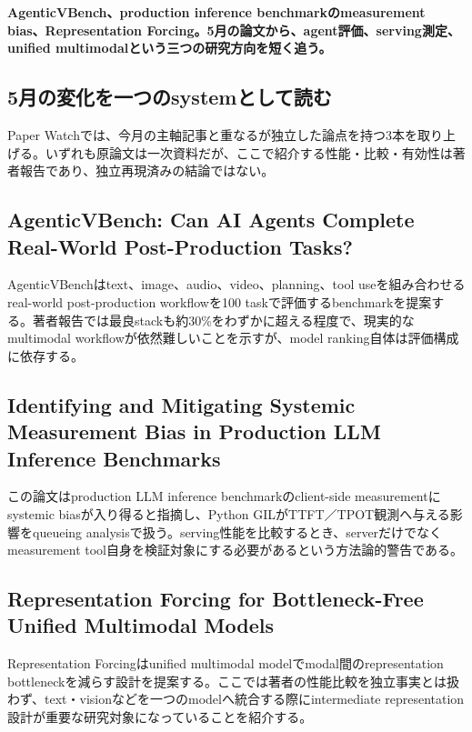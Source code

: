 \noindent\textbf{AgenticVBench、production inference benchmarkのmeasurement bias、Representation Forcing。5月の論文から、agent評価、serving測定、unified multimodalという三つの研究方向を短く追う。}\autocite{src-24add4f36a45,src-99d7ea892e92,src-ea2dcbeedd27}

\subsection{5月の変化を一つのsystemとして読む}

Paper Watchでは、今月の主軸記事と重なるが独立した論点を持つ3本を取り上げる。いずれも原論文は一次資料だが、ここで紹介する性能・比較・有効性は著者報告であり、独立再現済みの結論ではない。\autocite{src-24add4f36a45,src-99d7ea892e92,src-ea2dcbeedd27}


\subsection{AgenticVBench: Can AI Agents Complete Real-World Post-Production Tasks?}

AgenticVBenchはtext、image、audio、video、planning、tool useを組み合わせるreal-world post-production workflowを100 taskで評価するbenchmarkを提案する。著者報告では最良stackも約30\%をわずかに超える程度で、現実的なmultimodal workflowが依然難しいことを示すが、model ranking自体は評価構成に依存する。\autocite{src-ea2dcbeedd27}


\subsection{Identifying and Mitigating Systemic Measurement Bias in Production LLM Inference Benchmarks}

この論文はproduction LLM inference benchmarkのclient-side measurementにsystemic biasが入り得ると指摘し、Python GILがTTFT／TPOT観測へ与える影響をqueueing analysisで扱う。serving性能を比較するとき、serverだけでなくmeasurement tool自身を検証対象にする必要があるという方法論的警告である。\autocite{src-24add4f36a45}


\subsection{Representation Forcing for Bottleneck-Free Unified Multimodal Models}

Representation Forcingはunified multimodal modelでmodal間のrepresentation bottleneckを減らす設計を提案する。ここでは著者の性能比較を独立事実とは扱わず、text・visionなどを一つのmodelへ統合する際にintermediate representation設計が重要な研究対象になっていることを紹介する。\autocite{src-99d7ea892e92}


